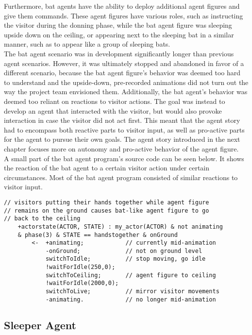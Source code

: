 \documentclass[draft,final]{vutinfth} %
\begin{document}
Furthermore, bat agents have the ability to deploy additional \glspl{agent figure} and give them commands. 
These \glspl{agent figure} have various roles, such as instructing the \gls{visitor} during the donning phase, while the bat agent figure was sleeping upside down on the ceiling, or appearing next to the sleeping bat in a similar manner, such as to appear like a group of sleeping bats. \\
The bat agent scenario was in development significantly longer than previous agent scenarios. 
However, it was ultimately stopped and abandoned in favor of a different scenario, because the bat \gls{agent figure}’s behavior was deemed too hard to understand and the upside-down, pre-recorded animations did not turn out the way the project team envisioned them. 
Additionally, the bat agent’s behavior was deemed too reliant on reactions to \gls{visitor} actions. 
The goal was instead to develop an agent that interacted with the \gls{visitor}, but would also provoke interaction in case the \gls{visitor} did not act first. 
This meant that the agent story had to encompass both reactive parts to \gls{visitor} input, as well as pro-active parts for the agent to pursue their own goals. 
The agent story introduced in the next chapter focuses more on autonomy and pro-active behavior of the \gls{agent figure}. \\
A small part of the bat agent program’s source code can be seen below. 
It shows the reaction of the bat agent to a certain \gls{visitor} action under certain circumstances. 
Most of the bat agent program consisted of similar reactions to \gls{visitor} input.
\begin{verbatim}
// visitors putting their hands together while agent figure 
// remains on the ground causes bat-like agent figure to go 
// back to the ceiling
    +actorstate(ACTOR, STATE) : my_actor(ACTOR) & not animating 
    & phase(3) & STATE == handstogether & onGround
        <-  +animating;	           // currently mid-animation
            -onGround;             // not on ground level
            switchToIdle;          // stop moving, go idle
            !waitForIdle(250,0);   
            switchToCeiling;       // agent figure to ceiling
            !waitForIdle(2000,0);	
            switchToLive;          // mirror visitor movements
            -animating.            // no longer mid-animation
\end{verbatim}

\subsection{Sleeper Agent}
\label{chap:sleeper}
\end{document}
